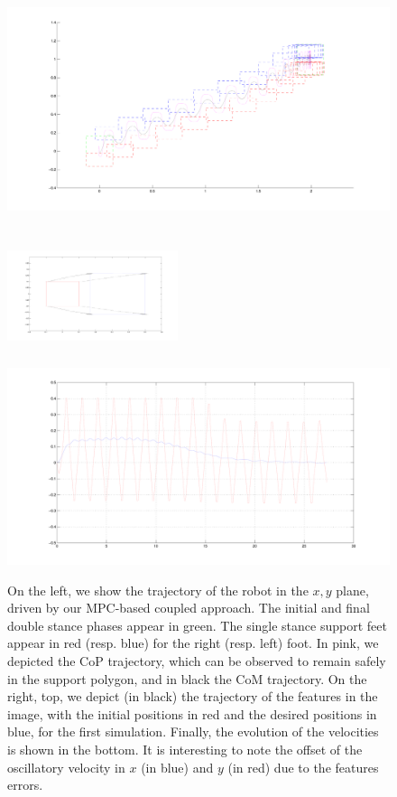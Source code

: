 \begin{figure}[h]
\begin{minipage}{0.5\textwidth}
 \centering
 \includegraphics[scale=.3]{Chap4-Visual-Servoing/steps1_hrp2.pdf}
\end{minipage}
\begin{minipage}{0.5\textwidth}
 \centering
 \includegraphics[width=5cm,height=4cm]{Chap4-Visual-Servoing/features1_hrp2.pdf}
\\
 \includegraphics[scale=.2]{Chap4-Visual-Servoing/vels1_hrp2.pdf}
\end{minipage}
 \caption[]{\label{Fig:Results1}\small{On the left, we show the trajectory of the robot in the $x,y$ plane, driven by our MPC-based coupled approach. The initial and final double stance phases appear in green. The single stance support feet appear in red (resp. blue) for the right (resp. left) foot. In pink, we depicted the CoP trajectory, which can be observed to remain safely in the support polygon, and in black the CoM trajectory. On the right, top, we depict (in black) the trajectory of the features in the image, with the initial positions in red and the desired positions in blue, for the first simulation.  Finally, the evolution of the velocities is shown in the bottom. It is interesting to note the offset of the oscillatory velocity in $x$ (in blue) and $y$ (in red) due to the features errors.}}
 \end{figure}


